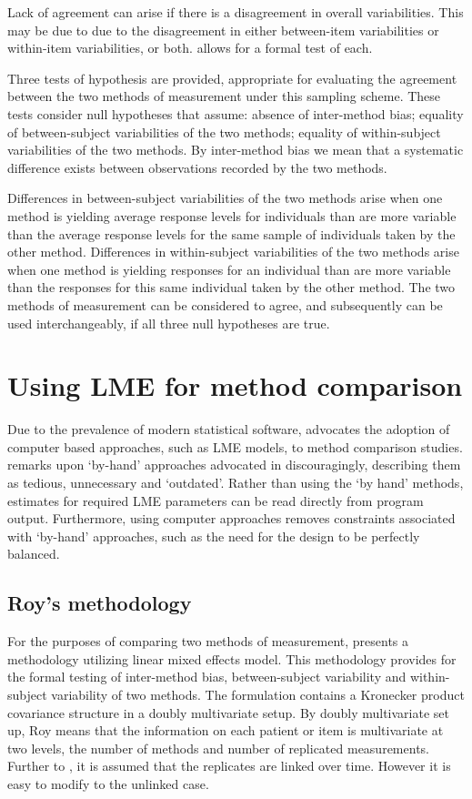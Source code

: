 \documentclass[12pt, a4paper]{report}
\theoremstyle{plain}
\theoremstyle{definition}
\theoremstyle{remark}
\begin{document}
Lack of agreement can arise if there is a disagreement in overall variabilities. This may be due to due to the disagreement in either between-item
variabilities or within-item variabilities, or both. \citet{ARoy2009} allows for a formal test of each.

\bigskip

Three tests of hypothesis are provided, appropriate for evaluating the agreement between the two methods of measurement under this sampling scheme. These tests consider null hypotheses that assume: absence of inter-method bias; equality of between-subject variabilities of the two methods; equality of within-subject variabilities of the two methods. By inter-method bias we mean that a systematic difference exists between observations recorded by the two methods. 

Differences in between-subject variabilities of the two methods arise when one method is yielding average response levels for individuals than are more variable than the average response levels for the same sample of individuals taken by the other method.  Differences in within-subject variabilities of the two methods arise when one method is yielding responses for an individual than are more variable than the responses for this same individual taken by the other method. The two methods of measurement can be considered to agree, and subsequently can be used interchangeably, if all three null hypotheses are true.	


\section{Using LME for method comparison}
Due to the prevalence of modern statistical software, \citet{BXC2008} advocates the adoption of computer based approaches, such as LME models, to method comparison studies. \citet{BXC2008} remarks upon `by-hand' approaches advocated in \citet{BA99} discouragingly, describing them as tedious, unnecessary and `outdated'. Rather than using the `by hand' methods, estimates for required LME parameters can be read directly from program output. Furthermore, using computer approaches removes constraints associated with `by-hand' approaches, such as the need for the design to be perfectly balanced.

\subsection{Roy's methodology}

For the purposes of comparing two methods of measurement, \citet{roy} presents a methodology utilizing linear mixed effects model. This methodology provides for the formal testing of inter-method bias, between-subject variability and within-subject variability of two methods. The formulation contains a Kronecker product covariance structure in a doubly multivariate setup. By doubly multivariate set up, Roy means that the information on each patient or item is multivariate at two levels, the number of methods and number of replicated measurements. Further to \citet{lam}, it is assumed that the replicates are linked over time. However it is easy to modify to the unlinked case.
\end{document}
